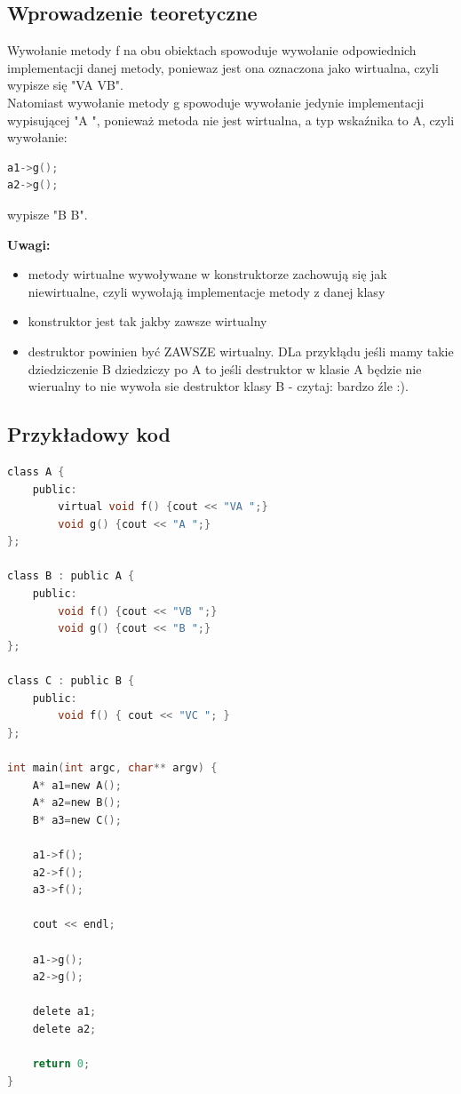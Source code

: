 \subsection{Wprowadzenie teoretyczne}
Wywołanie metody f na obu obiektach spowoduje wywołanie odpowiednich implementacji danej metody, poniewaz jest ona oznaczona jako wirtualna,
czyli wypisze się "VA VB".\\

Natomiast wywołanie metody g spowoduje wywołanie jedynie implementacji wypisującej "A ", ponieważ metoda nie jest wirtualna, a typ wskaźnika to A, czyli wywołanie:
\begin{lstlisting}[language=c]
a1->g();
a2->g();
\end{lstlisting}
wypisze "B B".

\textbf{Uwagi:}
\begin{itemize}
\item metody wirtualne wywoływane w konstruktorze zachowują się jak niewirtualne, czyli wywołają implementacje metody z danej klasy
\item konstruktor jest tak jakby zawsze wirtualny
\item destruktor powinien być ZAWSZE wirtualny. DLa przykłądu jeśli mamy takie dziedziczenie B dziedziczy po A to jeśli destruktor w klasie A będzie nie wierualny to nie wywoła sie destruktor klasy B - czytaj: bardzo źle :).
\end{itemize}

\subsection{Przykładowy kod}
\begin{lstlisting}[language=c]
class A {
	public:
		virtual void f() {cout << "VA ";}
		void g() {cout << "A ";}
};

class B : public A {
	public:
		void f() {cout << "VB ";}
		void g() {cout << "B ";}
};

class C : public B {
	public:
		void f() { cout << "VC "; }
};

int main(int argc, char** argv) {
	A* a1=new A();
	A* a2=new B();
	B* a3=new C();
	
	a1->f();
	a2->f();
	a3->f();
	
	cout << endl;
	
	a1->g();
	a2->g();
	
	delete a1;
	delete a2;
	
	return 0;
}
\end{lstlisting}